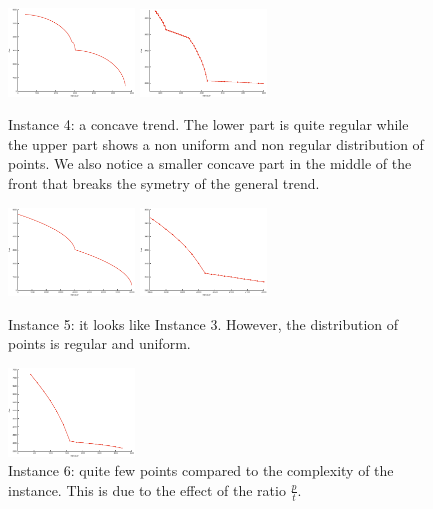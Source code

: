 \documentclass{llncs}
\begin{document}
\begin{figure}[h!]
  \centering
      \includegraphics[width=0.30\textwidth]{6}
      \includegraphics[width=0.30\textwidth]{6_zoom}
 \caption{\label{instance3} Instance 4: a concave trend. The lower part is quite regular while the upper part shows a non uniform and non regular distribution of points. We also notice a smaller concave part in the middle of the front that breaks the symetry of the general trend.}
\end{figure}
\begin{figure}[h!]
  \centering
      \includegraphics[width=0.30\textwidth]{8}
      \includegraphics[width=0.30\textwidth]{8_zoom}
 \caption{\label{instance4} Instance 5: it looks like Instance 3. However, the distribution of points is regular and uniform.}
\end{figure}
\begin{figure}[h!]
  \centering
      \includegraphics[width=0.30\textwidth]{7}
 \caption{\label{instance5} Instance 6: quite few points compared to the complexity of the instance. This is due to the effect of the ratio $\frac p t$.}
\end{figure}
\end{document}
